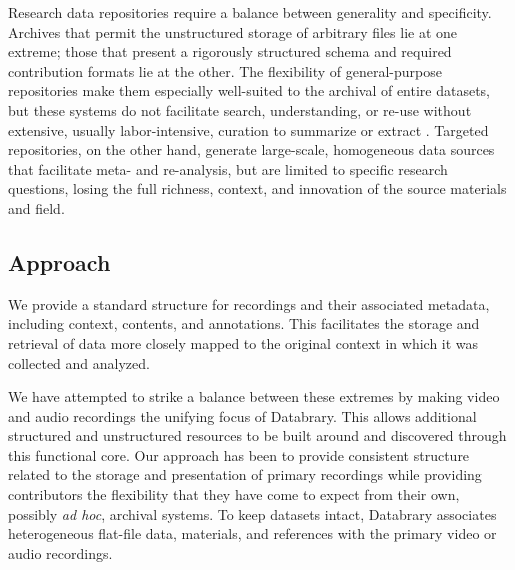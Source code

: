 \documentclass{sig-alternate}
\begin{document}
Research data repositories require a balance between generality and specificity.
Archives that permit the unstructured storage of arbitrary files lie at one extreme; those that present a rigorously structured schema and required contribution formats lie at the other.
The flexibility of general-purpose repositories make them especially well-suited to the archival of entire datasets, but these systems do not facilitate search, understanding, or re-use without extensive, usually labor-intensive, curation to summarize or extract \cite{Peer_2012}.
Targeted repositories, on the other hand, generate large-scale, homogeneous data sources that facilitate meta- and re-analysis, but are limited to specific research questions, losing the full richness, context, and innovation of the source materials and field.

\subsection{Approach}
We provide a standard structure for recordings and their associated metadata, including context, contents, and annotations.
This facilitates the storage and retrieval of data more closely mapped to the original context in which it was collected and analyzed.

We have attempted to strike a balance between these extremes by making video and audio recordings the unifying focus of Databrary.
This allows additional structured and unstructured resources to be built around and discovered through this functional core.
Our approach has been to provide consistent structure related to the storage and presentation of primary recordings while providing contributors the flexibility that they have come to expect from their own, possibly \emph{ad hoc}, archival systems.
To keep datasets intact, Databrary associates heterogeneous flat-file data, materials, and references with the primary video or audio recordings.
\end{document}
